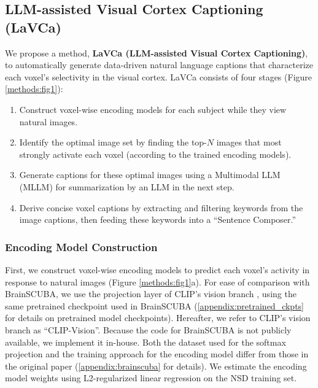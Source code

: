 
\subsection{LLM-assisted Visual Cortex Captioning (LaVCa)}
We propose a method, \textbf{LaVCa (LLM-assisted Visual Cortex Captioning)}, to automatically generate data-driven natural language captions that characterize each voxel’s selectivity in the visual cortex. LaVCa consists of four stages (Figure \ref{methods:fig1}): 

\begin{enumerate}
    \item Construct voxel-wise encoding models for each subject while they view natural images.
    \item Identify the optimal image set by finding the top-$N$ images that most strongly activate each voxel (according to the trained encoding models).
    \item Generate captions for these optimal images using a Multimodal LLM (MLLM) for summarization by an LLM in the next step.
    \item Derive concise voxel captions by extracting and filtering keywords from the image captions, then feeding these keywords into a ``Sentence Composer.''
\end{enumerate}


\subsubsection{Encoding Model Construction}
First, we construct voxel-wise encoding models to predict each voxel’s activity in response to natural images (Figure \ref{methods:fig1}a). For ease of comparison with BrainSCUBA, we use the projection layer of CLIP’s vision branch \cite{radford2021learning}, using the same pretrained checkpoint used in BrainSCUBA (\ref{appendix:pretrained_ckpts} for details on pretrained model checkpoints). Hereafter, we refer to CLIP's vision branch as ``CLIP-Vision''. Because the code for BrainSCUBA is not publicly available, we implement it in-house. Both the dataset used for the softmax projection and the training approach for the encoding model differ from those in the original paper (\ref{appendix:brainscuba} for details). We estimate the encoding model weights using L2-regularized linear regression on the NSD training set.

